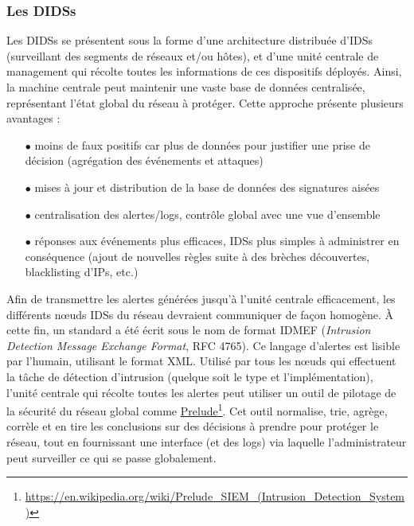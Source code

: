 \documentclass[]{article}
\begin{document}
\subsubsection{Les DIDSs}
\par Les DIDSs se présentent sous la forme d'une architecture distribuée d'IDSs (surveillant des segments de réseaux et/ou hôtes), et d'une unité centrale de management qui récolte toutes les informations de ces dispositifs déployés. Ainsi, la machine centrale peut maintenir une vaste base de données centralisée, représentant l'état global du réseau à protéger. Cette approche présente plusieurs 
avantages :
\vspace{0.2cm}
\begin{itemize}
\item[$\bullet$] moins de faux positifs car plus de données pour justifier une prise de décision (agrégation des événements et attaques)
\vspace{0.2cm}
\item[$\bullet$] mises à jour et distribution de la base de données des signatures aisées
\vspace{0.2cm}
\item[$\bullet$] centralisation des alertes/logs, contrôle global avec une vue d'ensemble
\vspace{0.2cm}
\item[$\bullet$] réponses aux événements plus efficaces, IDSs plus simples à administrer en conséquence (ajout de nouvelles règles suite à des brèches découvertes, blacklisting d'IPs, etc.)
\end{itemize}
\vspace{0.4cm}

\par Afin de transmettre les alertes générées jusqu'à l'unité centrale efficacement, les différents nœuds IDSs du réseau devraient communiquer de façon homogène. À cette fin, un standard a été écrit sous le nom de format IDMEF (\textit{Intrusion Detection Message Exchange Format}, RFC 4765). Ce langage d'alertes est lisible par l'humain, utilisant le format XML. Utilisé par tous les nœuds qui effectuent la tâche de détection d'intrusion (quelque soit le type et l'implémentation), l'unité centrale qui récolte toutes les alertes peut utiliser un outil de pilotage de la sécurité du réseau global comme \href{https://fr.wikipedia.org/wiki/Prelude_SIEM}{Prelude}\footnote{\url{https://en.wikipedia.org/wiki/Prelude_SIEM_(Intrusion_Detection_System)}}. Cet outil normalise, trie, agrège, corrèle et en tire les conclusions sur des décisions à prendre pour protéger le réseau, tout en fournissant une interface (et des logs) via laquelle l'administrateur peut surveiller ce qui se passe globalement.
\end{document}
